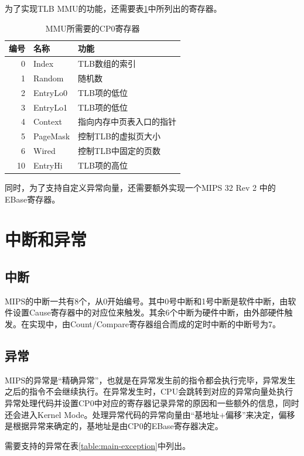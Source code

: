 为了实现TLB MMU的功能，还需要表\ref{table:mmu_cp0_registers}中所列出的寄存器。

\begin{table}[!htbp]
    \centering
    \begin{tabular}{|r|l|l|}
    \hline
    \textbf{编号} & \textbf{名称} & \textbf{功能}  \\ \hline
	0 & Index & TLB数组的索引 \\ \hline
	1 & Random & 随机数 \\ \hline
	2 & EntryLo0 & TLB项的低位 \\ \hline
	3 & EntryLo1 & TLB项的低位 \\ \hline
	4 & Context & 指向内存中页表入口的指针 \\ \hline
	5 & PageMask & 控制TLB的虚拟页大小 \\ \hline
	6 & Wired & 控制TLB中固定的页数 \\ \hline
	10 & EntryHi & TLB项的高位 \\ \hline
    \end{tabular}
    \caption{MMU所需要的CP0寄存器}
    \label{table:mmu_cp0_registers}
\end{table}

同时，为了支持自定义异常向量，还需要额外实现一个MIPS 32 Rev 2 中的 EBase寄存器。

\section{中断和异常}
\subsection{中断}
MIPS的中断一共有8个，从0开始编号。其中0号中断和1号中断是软件中断，由软件设置Cause寄存器中的对应位来触发。其余6个中断为硬件中断，由外部硬件触发。在实现中，由Count/Compare寄存器组合而成的定时中断的中断号为7。

\subsection{异常}
MIPS的异常是“精确异常”，也就是在异常发生前的指令都会执行完毕，异常发生之后的指令不会继续执行。在异常发生时，CPU会跳转到对应的异常向量处执行异常处理代码并设置CP0中对应的寄存器记录异常的原因和一些额外的信息，同时还会进入Kernel Mode。处理异常代码的异常向量由“基地址+偏移”来决定，偏移是根据异常来确定的，基地址是由CP0的EBase寄存器决定。

需要支持的异常在表\ref{table:main-exception}中列出。

